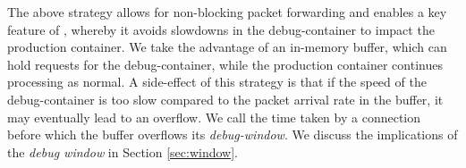 The above strategy allows for non-blocking packet forwarding and enables a key feature of \parikshan, whereby it avoids slowdowns in the debug-container to impact the production container.
We take the advantage of an in-memory buffer, which can hold requests for the debug-container, while the production container continues processing as normal.
A side-effect of this strategy is that if the speed of the debug-container is too slow compared to the packet arrival rate in the buffer, it may eventually lead to an overflow. 
We call the time taken by a connection before which the buffer overflows its \emph{debug-window}.
We discuss the implications of the \emph{debug window} in Section \ref{sec:window}.  
